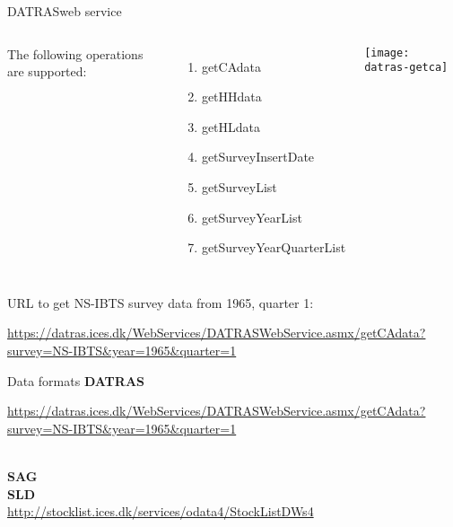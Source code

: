 \documentclass[aspectratio=169]{beamer}
\begin{document}

\begin{frame}{DATRAS}{web service}
  \begin{columns}
    \scriptsize
    \footnotesize The following operations are supported:\\[-0.5ex]
    \begin{enumerate}[-]\blue
      \item getCAdata\\[-1ex]
      \item getHHdata\\[-1ex]
      \item getHLdata\\[-1ex]
      \item getSurveyInsertDate\\[-1ex]
      \item getSurveyList\\[-1ex]
      \item getSurveyYearList\\[-1ex]
      \item getSurveyYearQuarterList\\[-1ex]
    \end{enumerate}
    \vspace{1ex}\texttt{[image: datras-getca]}
  \end{columns}
  \vspace{5ex}\footnotesize
  {\green URL to get NS-IBTS survey data from 1965, quarter 1:}\\[2ex]
  \hspace{3.6ex}
  \begin{minipage}{60ex}
    \setlength\parindent{-15pt}
    \scriptsize\url{https://datras.ices.dk/WebServices/DATRASWebService.asmx/getCAdata?survey=NS-IBTS\&year=1965\&quarter=1}
  \end{minipage}
\end{frame}


\begin{frame}{Data formats}
  \textbf{DATRAS}\\
  \begin{minipage}{60ex}
    \setlength\parindent{-15pt}
    \blue\scriptsize\url{https://datras.ices.dk/WebServices/DATRASWebService.asmx/getCAdata?survey=NS-IBTS\&year=1965\&quarter=1}
  \end{minipage}\\
  \textbf{SAG}\\
  
  \textbf{SLD}\\
  \blue\scriptsize\url{http://stocklist.ices.dk/services/odata4/StockListDWs4}
\end{frame}
\end{document}

